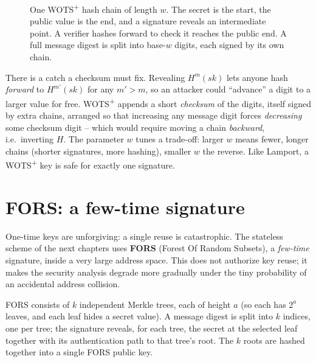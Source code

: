\begin{figure}[H]
\centering
{}
\caption{One WOTS\textsuperscript{+} hash chain of length $w$. The secret is the start, the public value is the end, and a signature reveals an intermediate point. A verifier hashes forward to check it reaches the public end. A full message digest is split into base-$w$ digits, each signed by its own chain.}
\label{fig:wots-chain}
\end{figure}

There is a catch a checksum must fix. Revealing $H^m(sk)$ lets anyone hash \emph{forward} to $H^{m'}(sk)$ for any $m'>m$, so an attacker could ``advance'' a digit to a larger value for free. WOTS\textsuperscript{+} appends a short \emph{checksum} of the digits, itself signed by extra chains, arranged so that increasing any message digit forces \emph{decreasing} some checksum digit -- which would require moving a chain \emph{backward}, i.e.\ inverting $H$. The parameter $w$ tunes a trade-off: larger $w$ means fewer, longer chains (shorter signatures, more hashing), smaller $w$ the reverse. Like Lamport, a WOTS\textsuperscript{+} key is safe for exactly one signature.

\section{FORS: a few-time signature}
One-time keys are unforgiving: a single reuse is catastrophic. The stateless scheme of the next chapters uses \textbf{FORS} (Forest Of Random Subsets), a \emph{few-time} signature, inside a very large address space. This does not authorize key reuse; it makes the security analysis degrade more gradually under the tiny probability of an accidental address collision.

\begin{definition}[FORS]
FORS consists of $k$ independent Merkle trees, each of height $a$ (so each has $2^a$ leaves, and each leaf hides a secret value). A message digest is split into $k$ indices, one per tree; the signature reveals, for each tree, the secret at the selected leaf together with its authentication path to that tree's root. The $k$ roots are hashed together into a single FORS public key.
\end{definition}


